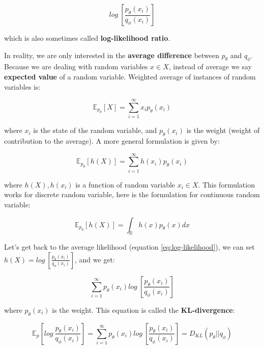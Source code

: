 \begin{equation}
\label{eq:log-likelihood}
    log\ [\frac{p_\theta(x_i)}{q_\phi(x_i)}]
\end{equation}

which is also sometimes called \textbf{log-likelihood ratio}.

In reality, we are only interested in the \textbf{average difference} between $p_\theta$ and $q_\phi$. Because we are dealing with random variables $x \in X$, instead of average we say \textbf{expected value} of a random variable. Weighted average of instances of random variables is:

\begin{equation*}
    \mathbb{E}_{p_\theta} [X] = \sum_{i=1}^{\infty} x_i p_\theta(x_i)
\end{equation*}

where $x_i$ is the state of the random variable, and $p_\theta(x_i)$ is the weight (weight of contribution to the average). A more general formulation is given by:

\begin{equation*}
    \mathbb{E}_{p_\theta} [h(X)] = \sum_{i=1}^{\infty} h(x_i) p_\theta(x_i)
\end{equation*}

where $h(X), h(x_i)$ is a function of random variable $x_i \in X$. This formulation works for discrete random variable, here is the formulation for continuous random variable:

\begin{equation*}
    \mathbb{E}_{p_\theta} [h(X)] = \int_{\mathbb{R}} h(x) p_\theta(x) dx
\end{equation*}

Let's get back to the average likelihood (equation \ref{eq:log-likelihood}), we can set $h(X) = log\ [\frac{p_\theta(x_i)}{q_\phi(x_i)}]$, and we get:

\begin{equation*}
    \sum_{i=1}^{\infty} p_\theta(x_i) log\ [\frac{p_\theta(x_i)}{q_\phi(x_i)}]
\end{equation*}

where $p_\theta(x_i)$ is the weight. This equation is called the \textbf{KL-divergence}:

\begin{equation}
\label{eq:kl_divergence}
    \mathbb{E}_p [log\ \frac{p_\theta(x_i)}{q_\phi(x_i)}]
    =
    \sum_{i=1}^{\infty} p_\theta(x_i) log\ [\frac{p_\theta(x_i)}{q_\phi(x_i)}]
    =
    D_{KL} (p_\theta || q_\phi)
\end{equation}


